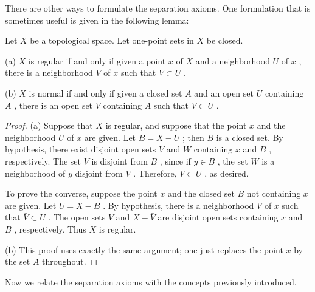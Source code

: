 There are other ways to formulate the separation axioms. One formulation that is sometimes useful is given in the following lemma:

\begin{lemma}
	Let \(X\) be a topological space. Let one-point sets in \(X\) be closed.

(a) \(X\) is regular if and only if given a point \(x\) of \(X\) and a neighborhood \(U\) of \(x\) , there is a neighborhood \(V\) of \(x\) such that \(\bar{V} \subset  U\) .

(b) \(X\) is normal if and only if given a closed set \(A\) and an open set \(U\) containing \(A\) , there is an open set \(V\) containing \(A\) such that \(\bar{V} \subset  U\) .
\end{lemma}

\begin{proof}
(a) Suppose that \(X\) is regular, and suppose that the point \(x\) and the neighborhood \(U\) of \(x\) are given. Let \(B = X - U\) ; then \(B\) is a closed set. By hypothesis, there exist disjoint open sets \(V\) and \(W\) containing \(x\) and \(B\) , respectively. The set \(\bar{V}\) is disjoint from \(B\) , since if \(y \in  B\) , the set \(W\) is a neighborhood of \(y\) disjoint from \(V\) . Therefore, \(\bar{V} \subset  U\) , as desired.

To prove the converse, suppose the point \(x\) and the closed set \(B\) not containing \(x\) are given. Let \(U = X - B\) . By hypothesis, there is a neighborhood \(V\) of \(x\) such that \(\bar{V} \subset  U\) . The open sets \(V\) and \(X - \bar{V}\) are disjoint open sets containing \(x\) and \(B\) , respectively. Thus \(X\) is regular.

(b) This proof uses exactly the same argument; one just replaces the point \(x\) by the set \(A\) throughout.
\end{proof}

Now we relate the separation axioms with the concepts previously introduced.

